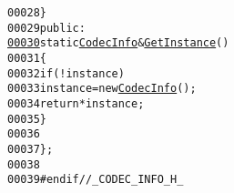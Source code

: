 \begin{footnotesize}
\begin{alltt}
00028         \}
00029 \textcolor{keyword}{public}:
\hypertarget{_codec_info_8h_source_l00030}{}\hyperlink{class_codec_info_ad439fd8062a03d868dfe9c9b615b747e}{00030}         \textcolor{keyword}{static} \hyperlink{class_codec_info}{CodecInfo} &\hyperlink{class_codec_info_ad439fd8062a03d868dfe9c9b615b747e}{GetInstance}()
00031         \{
00032                 \textcolor{keywordflow}{if} (!instance)
00033                         instance = \textcolor{keyword}{new} \hyperlink{class_codec_info_ab2ecf673aaa2480fafb0b3d22896e4b6}{CodecInfo}();
00034                 \textcolor{keywordflow}{return} *instance;
00035         \}
00036 
00037 \};
00038 
00039 \textcolor{preprocessor}{#endif //\_CODEC\_INFO\_H\_}
\end{alltt}\end{footnotesize}
